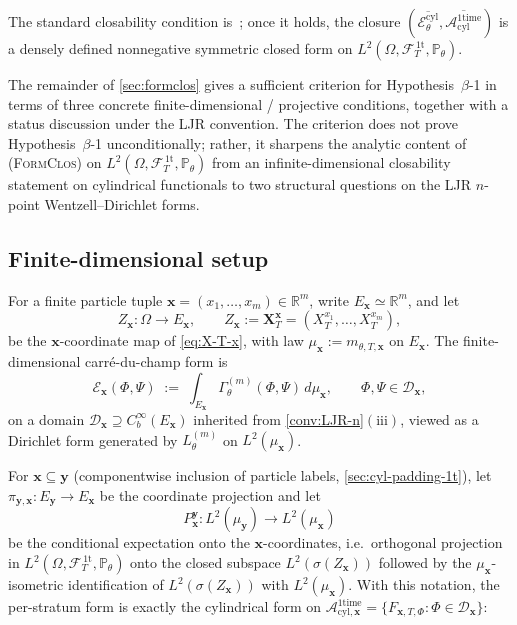 \documentclass[11pt,reqno]{amsart}
\theoremstyle{plain}
\theoremstyle{definition}
\theoremstyle{remark}
\newcommand{\R}{\mathbb R}
\newcommand{\Prob}{\mathbb P}
\newcommand{\cA}{\mathcal A}
\newcommand{\cE}{\mathcal E}
\newcommand{\cF}{\mathcal F}
\newcommand{\Aone}{\cA_{\mathrm{cyl}}^{\mathrm{1time}}}
\newcommand{\Aoneat}[1]{\cA^{\mathrm{1time}}_{\mathrm{cyl},#1}}
\newcommand{\FT}{\cF_{T}^{\,\mathrm{1t}}}
\newcommand{\Hone}{L^{2}(\Omega,\FT,\Pth)}
\newcommand{\GamM}[1]{\Gamma^{(#1)}_{\theta}}
\newcommand{\Lth}[1]{L^{(#1)}_{\theta}}
\newcommand{\Ecyl}{\cE_{\theta}^{\mathrm{cyl}}}
\newcommand{\Pth}{\Prob_{\theta}}
\begin{document}
The standard closability condition is~\cite[\S 1.3]{FOT}; once it
holds, the closure $(\overline{\Ecyl},\overline{\Aone})$ is a
densely defined nonnegative symmetric closed form on $\Hone$.

The remainder of \cref{sec:formclos} gives a sufficient criterion
for Hypothesis~$\beta$-1 in terms of three concrete
finite-dimensional / projective conditions, together with a status
discussion under the LJR convention. The criterion does not prove
Hypothesis~$\beta$-1 unconditionally; rather, it sharpens the
analytic content of \textsc{(FormClos)} on $\Hone$ from an
infinite-dimensional closability statement on cylindrical
functionals to two structural questions on the LJR $n$-point
Wentzell--Dirichlet forms.

\subsection{Finite-dimensional setup}\label{sec:formclos-setup}

For a finite particle tuple $\mathbf x=(x_{1},\ldots,x_{m})\in\R^{m}$,
write $E_{\mathbf x}\simeq\R^{m}$, and let
\begin{equation}\label{eq:Z-x}
  Z_{\mathbf x}\colon\Omega\to E_{\mathbf x},\qquad
  Z_{\mathbf x}:=\mathbf X_{T}^{\mathbf x}=(X_{T}^{x_{1}},\ldots,X_{T}^{x_{m}}),
\end{equation}
be the $\mathbf x$-coordinate map of \cref{eq:X-T-x}, with law
$\mu_{\mathbf x}:=m_{\theta,T,\mathbf x}$ on $E_{\mathbf x}$. The
finite-dimensional carr\'e-du-champ form is
\begin{equation}\label{eq:E-x-finite}
  \cE_{\mathbf x}(\Phi,\Psi)\;:=\;\int_{E_{\mathbf x}}\GamM{m}(\Phi,\Psi)\,d\mu_{\mathbf x},
  \qquad\Phi,\Psi\in\mathcal D_{\mathbf x},
\end{equation}
on a domain $\mathcal D_{\mathbf x}\supseteq C_{b}^{\infty}(E_{\mathbf x})$
inherited from \cref{conv:LJR-n}$(\mathrm{iii})$, viewed as a
Dirichlet form generated by $\Lth{m}$ on $L^{2}(\mu_{\mathbf x})$.

For $\mathbf x\subseteq\mathbf y$ (componentwise inclusion of
particle labels, \cref{sec:cyl-padding-1t}), let
$\pi_{\mathbf y,\mathbf x}\colon E_{\mathbf y}\to E_{\mathbf x}$ be
the coordinate projection and let
\begin{equation}\label{eq:P-J-I}
  P_{\mathbf x}^{\mathbf y}\colon L^{2}(\mu_{\mathbf y})\longrightarrow L^{2}(\mu_{\mathbf x})
\end{equation}
be the conditional expectation onto the $\mathbf x$-coordinates,
i.e.\ orthogonal projection in $\Hone$ onto the closed subspace
$L^{2}(\sigma(Z_{\mathbf x}))$ followed by the
$\mu_{\mathbf x}$-isometric identification of
$L^{2}(\sigma(Z_{\mathbf x}))$ with $L^{2}(\mu_{\mathbf x})$. With
this notation, the per-stratum form is exactly the cylindrical
form on $\Aoneat{\mathbf x}=\{F_{\mathbf x,T,\Phi}:\Phi\in\mathcal D_{\mathbf x}\}$:
\end{document}

